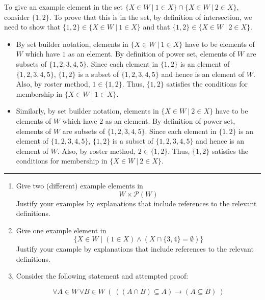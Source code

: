 \begin{enumerate}[labelindent=0pt, leftmargin=0pt]
    To give an example element in the set 
    $\{ X \in W ~|~ 1 \in X \} \cap \{ X \in W ~|~  2 \in X \}$,
    consider $\{ 1,2\}$. To prove that this is in the set, by definition of intersection, we need to show
    that $\{1,2\} \in \{ X \in W ~|~ 1 \in X \}$ and that $\{1,2\} \in \{ X \in W ~|~ 2 \in X \}$.
    \begin{itemize}
    \item By set builder notation, elements in $\{ X \in W ~|~ 1 \in X \}$ have to be elements of $W$ which have $1$ as an element. By definition of power set, elements of $W$ are subsets of $\{1,2,3,4,5\}$. Since
    each element in $\{1,2\}$ is an element of $\{1,2,3,4,5\}$, $\{1,2\}$ is a subset of $\{1,2,3,4,5\}$ 
    and hence is an element of $W$. Also, by roster method, $1 \in \{1,2\}$. Thus, $\{1,2\}$ satisfies the 
    conditions for membership in $\{ X \in W ~|~ 1 \in X \}$.
    \item Similarly, by set builder notation, elements in $\{ X \in W ~|~ 2 \in X \}$ have to be elements of $W$ 
    which have $2$ as an element. 
    By definition of power set, elements of $W$ are subsets of $\{1,2,3,4,5\}$. Since
    each element in $\{1,2\}$ is an element of $\{1,2,3,4,5\}$, $\{1,2\}$ is a subset of $\{1,2,3,4,5\}$ 
    and hence is an element of $W$. Also, by roster method, $2 \in \{1,2\}$. Thus, $\{1,2\}$ satisfies the 
    conditions for membership in $\{ X \in W ~|~ 2 \in X \}$.
    \end{itemize}
    
    \rule{0.5\textwidth}{.4pt}
    
    
    \begin{enumerate}
    \item\gradeCorrect Give two (different) example elements in 
    \[
    W \times \mathcal{P}(W)
    \]
    Justify your examples by explanations that include references to the relevant definitions.
    
    \item\gradeCorrect Give one example element in 
    \[
    \{ X \in W \mid (1 \in X) \land (X \cap \{3,4\} = \emptyset) \}
    \]
    Justify your example by explanations that include references to the relevant definitions.
    
    \item\gradeComplete Consider the following statement and attempted proof:
    
    
    $$\forall A \in W \, \forall B \in W ~\left(~((A \cap B) \subseteq A) \to (A \subseteq B)~\right)$$
    

\end{enumerate}
\end{enumerate}
